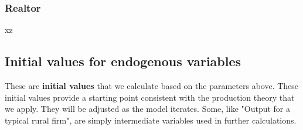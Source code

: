 \subsubsection{Realtor}
\begin{description}
\item[xz] 
\end{description}


\subsection{Initial values for endogenous variables} \label{sec-init-value-list}

These are \textbf{initial values} that we calculate based on the parameters above. These initial values provide  a starting point consistent with the production theory that we apply. They will be adjusted as the model iterates.  Some, like "Output for a typical rural firm", are simply intermediate variables used in further calculations.%

